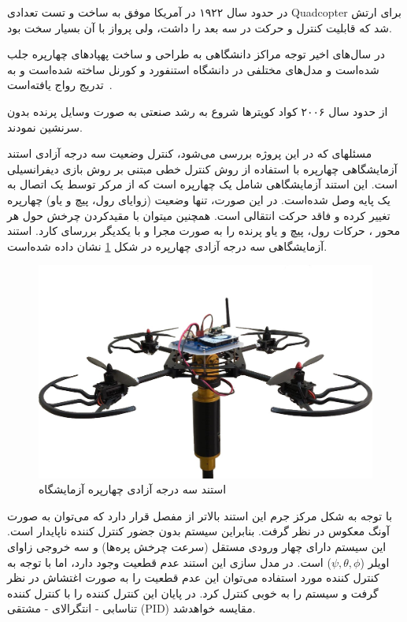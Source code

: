 در حدود سال ۱۹۲۲ در آمریکا  موفق به ساخت و تست تعدادی Quadcopter برای ارتش شد که قابلیت کنترل و حرکت در سه بعد را داشت، ولی پرواز با آن بسیار سخت بود.

در سال‌های اخیر توجه مراکز دانشگاهی به طراحی و ساخت پهپادهای چهارپره جلب شده‌است و مدل‌های مختلفی در دانشگاه استنفورد و کورنل ساخته شده‌است و به تدریج رواج یافته‌است~\cite{5717652}.

از حدود سال ۲۰۰۶ کواد کوپترها شروع به رشد صنعتی به صورت وسایل پرنده بدون سرنشین نمودند.


مسئلهای که در این پروژه بررسی می‌شود، کنترل وضعیت سه درجه آزادی استند آزمایشگاهی چهارپره با استفاده از روش کنترل خطی مبتنی بر روش بازی دیفرانسیلی است. این استند آزمایشگاهی شامل یک چهارپره است که از 
مرکر توسط یک اتصال به یک پایه وصل شده‌است. در این صورت، تنها وضعیت (زوایای رول، پیچ و یاو) 
چهارپره تغییر کرده و فاقد حرکت انتقالی است. همچنین میتوان با مقیدکردن چرخش حول هر محور ، 
حرکات رول، پیچ و یاو پرنده را به صورت مجرا و با یکدیگر بررسای کارد.
استند آزمایشگاهی سه درجه آزادی چهارپره در شکل \ref{LabQuad} نشان داده شده‌است.

\begin{figure}[H]\label{LabQuad}
	\includegraphics[width=12cm]{figs/introduction/3DOFQuad.jpg}
	\centering
	\caption{استند سه درجه آزادی چهارپره آزمایشگاه}
\end{figure}
با توجه به شکل مرکز جرم این استند بالاتر از مفصل قرار دارد که می‌توان به صورت آونگ معکوس در نظر گرفت. بنابراین سیستم بدون جضور کنترل کننده ناپایدار است. این سیستم دارای چهار ورودی مستقل (سرعت چرخش پره‌ها) و سه خروجی زاوای اویلر ($\psi, \theta, \phi$) است. در مدل سازی این استند عدم قطعیت وجود دارد، اما با توجه به کنترل کننده مورد استفاده می‌توان این عدم قطعیت را به صورت اغتشاش در نظر گرفت و سیستم را به خوبی کنترل کرد. در پایان این کنترل کننده را با کنترل کننده تناسابی - انتگرالای -
مشتقی (PID) مقایسه خواهد‌شد.




